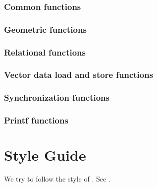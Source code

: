 \documentclass[letterpaper,10pt,english]{sphinxmanual}
\begin{document}
\subsection{Common functions}
\label{\detokenize{programming-interface/built-in/common:common-functions}}\label{\detokenize{programming-interface/built-in/common::doc}}

\subsection{Geometric functions}
\label{\detokenize{programming-interface/built-in/geometric:geometric-functions}}\label{\detokenize{programming-interface/built-in/geometric::doc}}

\subsection{Relational functions}
\label{\detokenize{programming-interface/built-in/relational:relational-functions}}\label{\detokenize{programming-interface/built-in/relational::doc}}

\subsection{Vector data load and store functions}
\label{\detokenize{programming-interface/built-in/vector:vector-data-load-and-store-functions}}\label{\detokenize{programming-interface/built-in/vector::doc}}

\subsection{Synchronization functions}
\label{\detokenize{programming-interface/built-in/synchronization:synchronization-functions}}\label{\detokenize{programming-interface/built-in/synchronization::doc}}

\subsection{Printf functions}
\label{\detokenize{programming-interface/built-in/printf:printf-functions}}\label{\detokenize{programming-interface/built-in/printf::doc}}

\chapter{Style Guide}
\label{\detokenize{style-guide/index:style-guide}}\label{\detokenize{style-guide/index::doc}}
We try to follow the style of . See .
\end{document}
